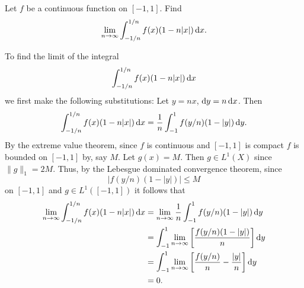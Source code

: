 \begin{problem}
  Let $f$ be a continuous function on $[-1,1]$. Find
  \[
    \lim_{n\to\infty}\int_{-1/n}^{1/n} f(x)(1-n|x|)\mathop{}\!\mathrm{d} x.
  \]
\end{problem}
\begin{solution}
  To find the limit of the integral
  \[
    \int_{-1/n}^{1/n} f(x)(1-n|x|)\mathop{}\!\mathrm{d} x
  \]
  we first make the following substitutions: Let $y=nx$, $\mathrm{d} y=n\mathop{}\!\mathrm{d}
  x$. Then
  \[
    \int_{-1/n}^{1/n} f(x)(1-n|x|)\diff x%
    =\frac{1}{n}\int_{-1}^1 f(y/n)(1-|y|)\diff y.
  \]
  By the extreme value theorem, since $f$ is continuous and $[-1,1]$ is
  compact $f$ is bounded on $[-1,1]$ by, say $M$. Let $g(x)=M$. Then $g\in
  L^1(X)$ since $\|g\|_1=2M$. Thus, by the Lebesgue dominated convergence
  theorem, since
  \[
    \left|f(y/n)(1-|y|)\right|\leq M
  \]
  on $[-1,1]$ and $g\in L^1([-1,1])$ it follows that
  \begin{align*}
    \lim_{n\to\infty}\int_{-1/n}^{1/n} f(x)(1-n|x|)\diff x
    &=\lim_{n\to\infty}\frac{1}{n}\int_{-1}^1 f(y/n)(1-|y|)\diff y\\
    &=\int_{-1}^1\lim_{n\to\infty}\left[\frac{f(y/n)(1-|y|)}{n}\right]\rmd
      y\\
    &=\int_{-1}^1\lim_{n\to\infty}%
      \left[%
      \frac{f(y/n)}{n}-\frac{|y|}{n}
      \right]\rmd y\\%
    &=0.
  \end{align*}
\end{solution}

